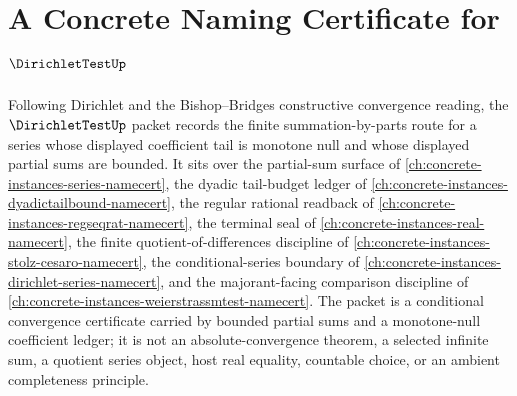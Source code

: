 \chapter{A Concrete Naming Certificate for $\DirichletTestUp$}
\label{ch:concrete-instances-dirichlettest-namecert}

Following Dirichlet and the Bishop--Bridges constructive convergence reading, the $\DirichletTestUp$ packet records the finite summation-by-parts route for a series whose displayed coefficient tail is monotone null and whose displayed partial sums are bounded. It sits over the partial-sum surface of \autoref{ch:concrete-instances-series-namecert}, the dyadic tail-budget ledger of \autoref{ch:concrete-instances-dyadictailbound-namecert}, the regular rational readback of \autoref{ch:concrete-instances-regseqrat-namecert}, the terminal seal of \autoref{ch:concrete-instances-real-namecert}, the finite quotient-of-differences discipline of \autoref{ch:concrete-instances-stolz-cesaro-namecert}, the conditional-series boundary of \autoref{ch:concrete-instances-dirichlet-series-namecert}, and the majorant-facing comparison discipline of \autoref{ch:concrete-instances-weierstrassmtest-namecert}. The packet is a conditional convergence certificate carried by bounded partial sums and a monotone-null coefficient ledger; it is not an absolute-convergence theorem, a selected infinite sum, a quotient series object, host real equality, countable choice, or an ambient completeness principle.

